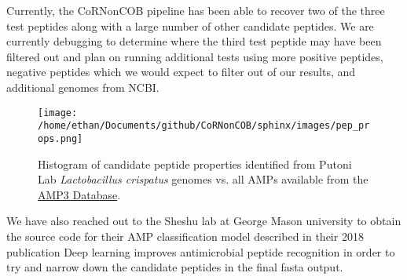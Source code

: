 \documentclass{article}
\begin{document}
Currently, the CoRNonCOB pipeline has been able to recover two of the three test peptides along with a large number of other candidate peptides. We are currently debugging to determine where the third test peptide may have been filtered out and plan on running additional tests using more positive peptides, negative peptides which we would expect to filter out of our results, and additional genomes from NCBI.

\begin{figure}[h]
\centering
\texttt{[image: /home/ethan/Documents/github/CoRNonCOB/sphinx/images/pep\_props.png]}
\caption{Histogram of candidate peptide properties identified from Putoni Lab \emph{Lactobacillus crispatus} genomes vs. all AMPs available from the \href{http://aps.unmc.edu/AP/main.php}{AMP3 Database}.}
\end{figure}

We have also reached out to the Sheshu lab at George Mason university to obtain the source code for their AMP classification model described in their 2018 publication Deep learning improves antimicrobial peptide recognition in order to try and narrow down the candidate peptides in the final fasta output. 

\newpage
{}


\end{document}
